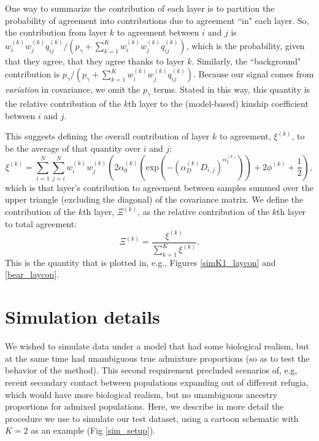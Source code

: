 \documentclass[10pt,letterpaper]{article}
\begin{document}
One way to summarize the contribution of each layer is to partition the probability of agreement
into contributions due to agreement ``in" each layer.
So, the contribution from layer $k$ to agreement between $i$ and $j$ is 
$w_i^{(k)} w_j^{(k)} q^{(k)}_{ij} / (p_\gamma + \sum_{k=1}^K w_i^{(k)} w_j^{(k)} q^{(k)}_{ij})$,
which is the probability, given that they agree, that they agree thanks to layer $k$.
Similarly, the ``background" contribution is $p_\gamma / (p_\gamma + \sum_{k=1}^K w_i^{(k)} w_j^{(k)} q^{(k)}_{ij})$.
Because our signal comes from \emph{variation} in covariance, we omit
the $p_\gamma$ terms. 
Stated in this way, this quantity is the
relative contribution of the $k$th layer to the (model-based) kinship
coefficient between $i$ and $j$.

This suggests defining the overall contribution of layer $k$ to agreement, $\xi^{(k)}$, 
to be the average of that quantity over $i$ and $j$:
\begin{equation}
\xi^{(k)} = 
	\sum\limits_{i=1}^{N}
		\sum\limits_{j=i}^N
			w^{(k)}_iw^{(k)}_j 
				\left(	
					2\alpha^{(k)}_0 
						\left( \text{exp} 
							\left( -(\alpha^{(k)}_D D_{i,j}) ^ {\alpha^{(k)}_2}\right) 
						\right) + 2\phi^{(k)} + \frac{1}{2}
				\right) ,
\label{abs_layer_contribution}
\end{equation}
which is that layer's contribution to agreement between samples 
summed over the upper triangle (excluding the diagonal) of the covariance matrix.
We define the contribution of the $k$th layer, $\Xi^{(k)}$, 
as the relative contribution of the $k$th layer to total agreement:
\begin{equation}
\Xi^{(k)} = 
\frac{\xi^{(k)}}
	{\sum\limits_{k=1}^{K}
	    	\xi^{(k)}} .
\label{rel_layer_contribution}
\end{equation}
This is the quantity that is plotted in, e.g., Figures \ref{simK1_laycon} and \ref{bear_laycon}.


\section*{Simulation details}\label{sim_details}
We wished to simulate data under a model that had some biological realism, 
but at the same time had unambiguous true admixture proportions 
(so as to test the behavior of the method).
This second requirement precluded scenarios of, e.g, 
recent secondary contact between populations expanding out of different refugia, 
which would have more biological realism, 
but no unambiguous ancestry proportions for admixed populations.
Here, we describe in more detail the procedure we use to simulate our test dataset, 
using a cartoon schematic with $K=2$ as an example (Fig \ref{sim_setup}).
\end{document}
